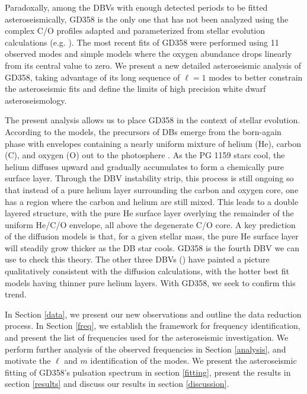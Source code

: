 \documentclass[12pt,preprint]{aastex}
\begin{document}
Paradoxally, among the DBVs with enough detected periods to be fitted 
asteroseismically, GD358 is the only one that has not been analyzed using the complex 
C/O profiles adapted and parameterized from stellar evolution calculations
(e.g. {}\citet{Salaris97,Althaus05}). The most recent fits of GD358 \citep{Metcalfe03c} were 
performed using 11 observed modes and simple models where the oxygen abundance 
drops linearly from its central value to zero. We present a new detailed asteroseismic analysis of GD358, taking advantage of 
its long sequence of $\ell=1$ modes to better constrain the asteroseismic fits and 
define the limits of high precision white dwarf asteroseismology.  

The present analysis allows us to place GD358 in the context of stellar evolution. 
According to the models, the precursors of DBs emerge from the born-again phase with 
envelopes containing a nearly uniform mixture of helium (He), carbon (C), and oxygen (O) 
out to the photosphere \citep{Dreizler98,Herwig99}. As the PG 1159 stars cool, the helium 
diffuses upward and gradually accumulates to form a chemically pure surface layer. Through 
the DBV instability strip, this process is still ongoing so that instead of a pure helium 
layer surrounding the carbon and oxygen core, one has a region where the carbon and helium 
are still mixed. This leads to a double layered structure, with the pure He surface layer 
overlying the remainder of the uniform He/C/O envelope, all above the degenerate C/O core. 
A key prediction of the diffusion models is that, for a given stellar mass, the pure He 
surface layer will steadily grow thicker as the DB star cools.  GD358 is the fourth DBV 
we can use to check this theory. The other three DBVs 
(\citet{Bischoff-Kim14,Sullivan08, Metcalfe03c}) have painted a picture qualitatively consistent with 
the diffusion calculations, with the hotter best fit models having thinner pure helium 
layers. With GD358, we seek to confirm this trend.

In Section \ref{data}, we present our new observations and outline the data reduction process.  
In Section \ref{freq}, we establish the framework for frequency identification, and present the 
list of frequencies used for the asteroseismic investigation. We perform further analysis of the observed frequencies in Section \ref{analysis}, and motivate the $\ell$ and $m$ identification of the modes. We present the asteroseismic fitting of GD358's pulsation spectrum in section \ref{fitting}, present the results in section \ref{results} and discuss our results in section \ref{discussion}.
\end{document}

